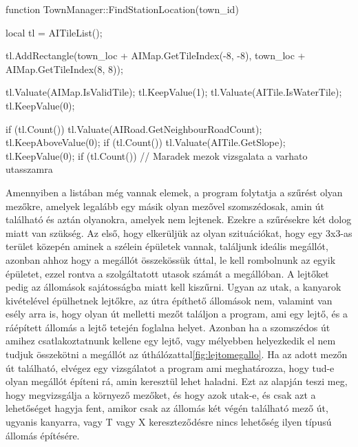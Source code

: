 \begin{cpp}
function TownManager::FindStationLocation(town_id) {
  local tl = AITileList();
  
  tl.AddRectangle(town_loc + AIMap.GetTileIndex(-8, -8),
   town_loc + AIMap.GetTileIndex(8, 8));
   
  tl.Valuate(AIMap.IsValidTile);
  tl.KeepValue(1);
  tl.Valuate(AITile.IsWaterTile);
  tl.KeepValue(0);
  
  if (tl.Count()) {
    tl.Valuate(AIRoad.GetNeighbourRoadCount);
  	tl.KeepAboveValue(0);
  	if (tl.Count()) {
      tl.Valuate(AITile.GetSlope);
      tl.KeepValue(0);
      if (tl.Count()) {
      	// Maradek mezok vizsgalata a varhato utasszamra
      }
    }
  }
}
\end{cpp}

Amennyiben a listában még vannak elemek, a program folytatja a szűrést olyan mezőkre, amelyek legalább egy másik olyan mezővel szomszédosak, amin út található és aztán olyanokra, amelyek nem lejtenek. Ezekre a szűrésekre két dolog miatt van szükség. Az első, hogy elkerüljük az olyan szituációkat, hogy egy 3x3-as terület közepén aminek a szélein épületek vannak, találjunk ideális megállót, azonban ahhoz hogy a megállót összekössük úttal, le kell rombolnunk az egyik épületet, ezzel rontva a szolgáltatott utasok számát a megállóban. A lejtőket pedig az állomások sajátosságba miatt kell kiszűrni. Ugyan az utak, a kanyarok kivételével épülhetnek lejtőkre, az útra építhető állomások nem, valamint van esély arra is, hogy olyan út melletti mezőt találjon a program, ami egy lejtő, és a ráépített állomás a lejtő tetején foglalna helyet. Azonban ha a szomszédos út amihez csatlakoztatnunk kellene egy lejtő, vagy mélyebben helyezkedik el nem tudjuk összekötni a megállót az úthálózattal\ref{fig:lejtomegallo}. Ha az adott mezőn út található, elvégez egy vizsgálatot a program ami meghatározza, hogy tud-e olyan megállót építeni rá, amin keresztül lehet haladni. Ezt az alapján teszi meg, hogy megvizsgálja a környező mezőket, és hogy azok utak-e, és csak azt a lehetőséget hagyja fent, amikor csak az állomás két végén található mező út, ugyanis kanyarra, vagy T vagy X kereszteződésre nincs lehetőség ilyen típusú állomás építésére.

